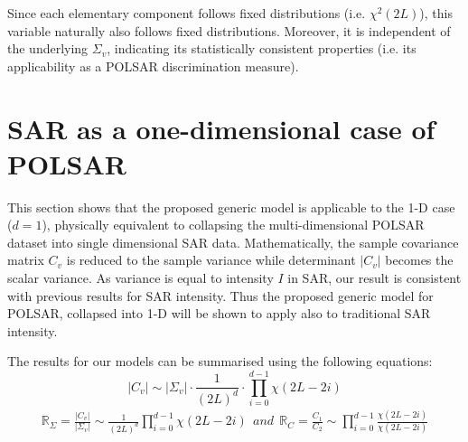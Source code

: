 \documentclass[]{tRSL2e}
\begin{document}
%
Since each elementary component follows fixed distributions (i.e. $\chi^2(2L)$),
this variable naturally also follows fixed distributions.
Moreover, it is independent of the underlying $\Sigma_v$,
  indicating its statistically consistent properties (i.e. its applicability as a POLSAR discrimination measure).

\section{SAR as a one-dimensional case of POLSAR}
\label{sec:sar_special_case_of_polsar}

This section shows that the proposed generic model is  applicable to the 1-D case ($d=1$),
physically equivalent to  collapsing the multi-dimensional POLSAR dataset  into single dimensional SAR data.
Mathematically, the sample covariance matrix $C_v$ is reduced to the sample variance while determinant $|C_v|$ becomes the scalar variance.
As variance is equal to intensity $I$ in SAR, our result is consistent with previous results for SAR intensity.
Thus the proposed generic model for POLSAR, collapsed into 1-D will be shown to apply also to traditional SAR intensity.%
  
The results for our models can be summarised using the following equations:
\begin{equation}\nonumber
  |C_v| \sim |\Sigma_v| \cdot \frac{1}{(2L)^d} \cdot \prod_{i=0}^{d-1} \chi (2L-2i) 
\end{equation}
\begin{eqnarray}\nonumber
\mathbb{R}_{\Sigma} = \frac{|C_v|}{|\Sigma_v|} \sim \frac{1}{(2L)^d} \prod^{d-1}_{i=0} \chi(2L-2i) ~~and~~
\mathbb{R}_{C} = \frac{C_1}{C_2} \sim \prod_{i=0}^{d-1} \frac{\chi(2L-2i)}{\chi(2L-2i)}
\end{eqnarray}
\end{document}
